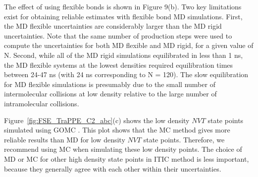 \documentclass[5p,times]{elsarticle}
\begin{document}
The effect of using flexible bonds is shown in Figure 9(b). Two key limitations exist for obtaining reliable estimates with flexible bond MD simulations. First, the MD flexible uncertainties are considerably larger than the MD rigid uncertainties. Note that the same number of production steps were used to compute the uncertainties for both MD flexible and MD rigid, for a given value of N. Second, while all of the MD rigid simulations equilibrated in less than 1 ns, the MD flexible systems at the lowest densities required equilibration times between 24-47 ns (with 24 ns corresponding to N = 120). The slow equilibration for MD flexible simulations is presumably due to the small number of intermolecular collisions at low density relative to the large number of intramolecular collisions.

Figure~\ref{fig:FSE_TraPPE_C2_abc}(c) shows the low density $NVT$ state points simulated using GOMC \cite{Mick2013}. This plot shows that the MC method gives more reliable results than MD for low density $NVT$ state points. Therefore, we recommend using MC when simulating these low density points. The choice of MD or MC for other high density state points in ITIC method is less important, because they generally agree with each other within their uncertainties.
\end{document}
